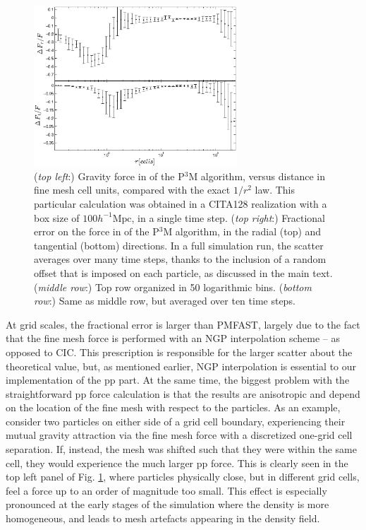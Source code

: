 \documentclass[useAMS,usenatbib]{mn2e}
\begin{document}
\begin{figure}
\begin{center}
    \includegraphics[width=3.0in]{graphs/densityForce_fracErr_ppext=0_rebin_N10_new-1.eps}
  \caption{({\it top left}:) Gravity force in of the P$^3$M algorithm, versus distance in fine mesh cell units, compared with the exact $1/r^{2}$ law.
    This particular calculation was obtained in a CITA128 realization with  a box size of $100 h^{-1}\mbox{Mpc}$,
    in a single time step. 
    ({\it top right}:) Fractional error on the force in of the P$^3$M algorithm, in the radial (top) and tangential (bottom) directions.
  In a full simulation run, the scatter averages over many time steps, 
    thanks to the inclusion of a random offset that is imposed on each particle, as discussed in the main text.
    ({\it middle row}:) Top row organized in 50 logarithmic bins.  
    ({\it bottom row}:) Same as middle row, but averaged over ten time steps.
    \label{fig:den_force_fracErr}}
\end{center}
\end{figure}

At grid scales, the fractional error is larger than {\small PMFAST}, largely due to the fact that the fine mesh force is performed with an NGP interpolation scheme -- as opposed to CIC. This prescription is responsible for the larger scatter about the theoretical value, but, as mentioned earlier, 
NGP interpolation is essential to our implementation of the pp part.
At the same time, the biggest problem with the straightforward pp force calculation is that the results 
are anisotropic and depend on the location of the fine mesh with respect 
to the particles. As an example, consider two particles on either side of a grid 
cell boundary, experiencing their mutual gravity attraction via the fine mesh force with a discretized one-grid cell separation.
 If, instead, the mesh was shifted such that they were
within the same cell, they would experience the much larger pp force. 
This is clearly seen in the top left panel of Fig. \ref{fig:den_force_fracErr}, where particles physically close, but in different grid cells, 
feel a force up to an order of magnitude too small.
This effect is especially pronounced at the early stages of the simulation where
the density is more homogeneous, and leads to mesh artefacts appearing
in the density field.
\end{document}
